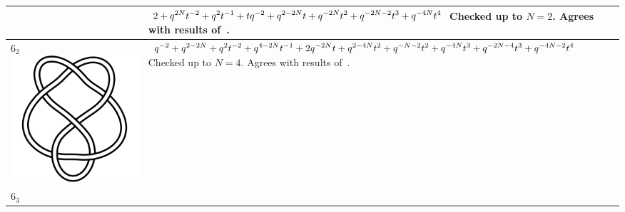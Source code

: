 \documentclass{compositio}
\theoremstyle{definition}
\numberwithin{equation}{section}
\begin{document}
{\begin{longtable}{p{}|p{}}
& 
$
\displaystyle{%
2+q^{2 N}t^{-2}+q^2 t^{-1}+ t q^{-2} + q^{2-2N} t+q^{-2 N} t^2+q^{-2N-2} t^3+q^{-4 N} t^4
}
$
\newline\newline\newline\newline
Checked up to $N=2$. Agrees with results of~\cite{r0508510, r0607544}. 
\\
\hline
$6_{2}$ 
\includegraphics[scale=0.07,angle=0]{knot6_2.pdf} 
& 
$
\displaystyle{%
q^{-2} + q^{2-2 N} + q^2t^{-2} + q^{4-2 N} t^{-1} + 2 q^{-2 N} t+q^{2-4 N} t^2+q^{-N-2} t^2+q^{-4 N} t^3+q^{-2N-4} t^3+q^{-4N-2} t^4
}
$
\newline\newline\newline\newline
Checked up to $N=4$. Agrees with results of~\cite{r0508510, r0607544}. 
\\
\hline
$6_{3}$ 

\end{longtable}}
\end{document}
